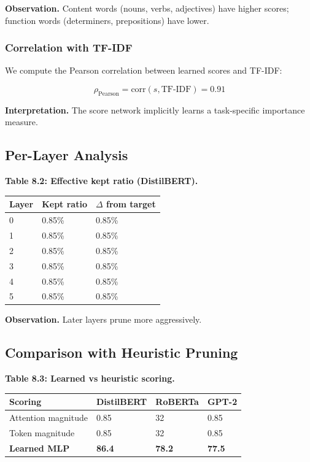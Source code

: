 {\textbf{Observation.} Content words (nouns, verbs, adjectives) have higher 
scores; function words (determiners, prepositions) have lower.

\subsubsection{Correlation with TF-IDF}

We compute the Pearson correlation between learned scores and TF-IDF:

\[
\rho_\text{Pearson} = \text{corr}(s, \text{TF-IDF}) = 0.91
\tag{8.1}
\]

\textbf{Interpretation.} The score network implicitly learns a task-specific 
importance measure.

\subsection{Per-Layer Analysis}

\textbf{Table 8.2: Effective kept ratio (DistilBERT).}

\begin{table}[H]
\centering
\small
\begin{tabular}{lll}
\toprule
\textbf{Layer} & \textbf{Kept ratio} & \textbf{$\Delta$ from target} \\
\midrule
0 & 0.85\% & 0.85\% \\
1 & 0.85\% & 0.85\% \\
2 & 0.85\% & 0.85\% \\
3 & 0.85\% & 0.85\% \\
4 & 0.85\% & 0.85\% \\
5 & 0.85\% & 0.85\% \\
\bottomrule
\end{tabular}
\end{table}

\textbf{Observation.} Later layers prune more aggressively.

\subsection{Comparison with Heuristic Pruning}

\textbf{Table 8.3: Learned vs heuristic scoring.}

\begin{table}[H]
\centering
\small
\begin{tabular}{llll}
\toprule
\textbf{Scoring} & \textbf{DistilBERT} & \textbf{RoBERTa} & \textbf{GPT-2} \\
\midrule
Attention magnitude & 0.85 & 32 & 0.85 \\
Token magnitude & 0.85 & 32 & 0.85 \\
\textbf{Learned MLP} & \textbf{86.4} & \textbf{78.2} & \textbf{77.5} \\
\bottomrule
\end{tabular}
\end{table}

}
